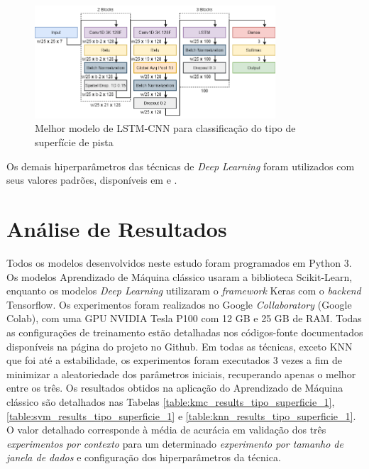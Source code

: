 \begin{figure}[H]
  \centering
  \caption{Melhor modelo de LSTM-CNN para classificação do tipo de superfície de pista}
  \label{fig:best_cnn_lstm_tipo_superficie_1}
  \includegraphics[width=0.8\textwidth]{figuras/fig_33.png}
\end{figure}

Os demais hiperparâmetros das técnicas de \textit{Deep Learning} foram utilizados com seus valores padrões, disponíveis em  e .

\section{Análise de Resultados}

Todos os modelos desenvolvidos neste estudo foram programados em Python 3. Os modelos Aprendizado de Máquina clássico usaram a biblioteca Scikit-Learn, enquanto os modelos \textit{Deep Learning} utilizaram o \textit{framework} Keras com o \textit{backend} Tensorflow. Os experimentos foram realizados no Google \textit{Collaboratory} (Google Colab), com uma GPU NVIDIA Tesla P100 com 12 GB e 25 GB de RAM. Todas as configurações de treinamento estão detalhadas nos códigos-fonte documentados disponíveis na página do projeto no Github. Em todas as técnicas, exceto KNN que foi até a estabilidade, os experimentos foram executados 3 vezes a fim de minimizar a aleatoriedade dos parâmetros iniciais, recuperando apenas o melhor entre os três. Os resultados obtidos na aplicação do Aprendizado de Máquina clássico são detalhados nas Tabelas \ref{table:kmc_results_tipo_superficie_1}, \ref{table:svm_results_tipo_superficie_1} e \ref{table:knn_results_tipo_superficie_1}. O valor detalhado corresponde à média de acurácia em  validação dos três \textit{experimentos por contexto} para um determinado \emph{experimento por tamanho de janela de dados} e configuração dos hiperparâmetros da técnica.

